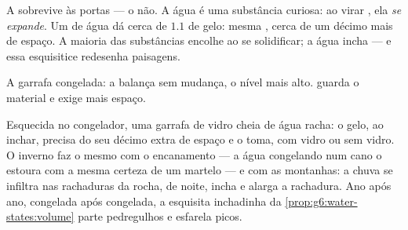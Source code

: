 \begin{proposition}\label{prop:g6:water-states:volume}
A  sobrevive às portas --- o  não. A água é uma substância
curiosa: ao virar , ela \emph{se expande}. Um  de água dá
cerca de $1.1$  de gelo: mesma , cerca de um décimo mais de
espaço. A maioria das substâncias encolhe ao se solidificar; a água
incha --- e essa esquisitice redesenha paisagens.
\end{proposition}

\begin{omfigure}

{\small A garrafa congelada: a balança sem mudança, o nível mais
alto.  guarda o material e exige mais espaço.}
\end{omfigure}

\begin{example}\label{ex:g6:water-states:burst}
Esquecida no congelador, uma garrafa de vidro cheia de água racha: o
gelo, ao inchar, precisa do seu décimo extra de espaço e o toma, com
vidro ou sem vidro. O inverno faz o mesmo com o encanamento --- a
água congelando num cano o estoura com a mesma certeza de um martelo
--- e com as montanhas: a chuva se infiltra nas rachaduras da rocha,
 de noite, incha e alarga a rachadura. Ano após ano, congelada
após congelada, a esquisita inchadinha da
\cref{prop:g6:water-states:volume} parte pedregulhos e esfarela
picos.
\end{example}

